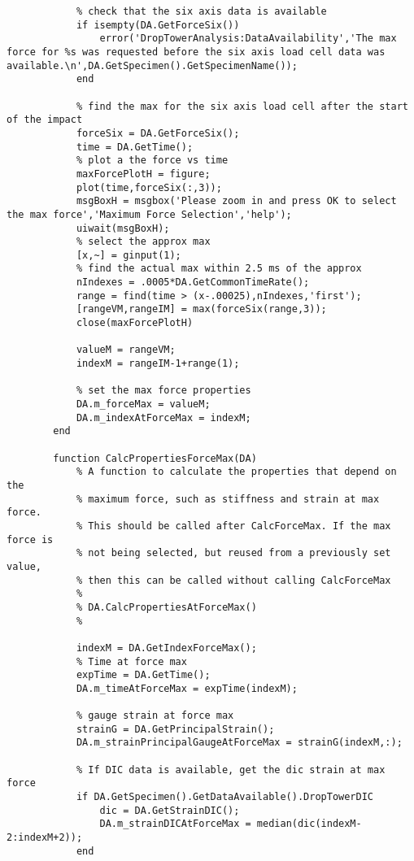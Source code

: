 \begin{lstlisting}
            % check that the six axis data is available
            if isempty(DA.GetForceSix())
                error('DropTowerAnalysis:DataAvailability','The max force for %s was requested before the six axis load cell data was available.\n',DA.GetSpecimen().GetSpecimenName());
            end
            
            % find the max for the six axis load cell after the start of the impact
            forceSix = DA.GetForceSix();
            time = DA.GetTime();
            % plot a the force vs time
            maxForcePlotH = figure;
            plot(time,forceSix(:,3));
            msgBoxH = msgbox('Please zoom in and press OK to select the max force','Maximum Force Selection','help');
            uiwait(msgBoxH);
            % select the approx max
            [x,~] = ginput(1);
            % find the actual max within 2.5 ms of the approx        
            nIndexes = .0005*DA.GetCommonTimeRate();
            range = find(time > (x-.00025),nIndexes,'first');
            [rangeVM,rangeIM] = max(forceSix(range,3));
            close(maxForcePlotH)
            
            valueM = rangeVM;
            indexM = rangeIM-1+range(1);
 
            % set the max force properties
            DA.m_forceMax = valueM;
            DA.m_indexAtForceMax = indexM;
        end
        
        function CalcPropertiesForceMax(DA)
            % A function to calculate the properties that depend on the
            % maximum force, such as stiffness and strain at max force.
            % This should be called after CalcForceMax. If the max force is
            % not being selected, but reused from a previously set value,
            % then this can be called without calling CalcForceMax
            %
            % DA.CalcPropertiesAtForceMax()
            %
            
            indexM = DA.GetIndexForceMax();
            % Time at force max
            expTime = DA.GetTime();
            DA.m_timeAtForceMax = expTime(indexM);
            
            % gauge strain at force max
            strainG = DA.GetPrincipalStrain();
            DA.m_strainPrincipalGaugeAtForceMax = strainG(indexM,:);
            
            % If DIC data is available, get the dic strain at max force
            if DA.GetSpecimen().GetDataAvailable().DropTowerDIC
                dic = DA.GetStrainDIC();
                DA.m_strainDICAtForceMax = median(dic(indexM-2:indexM+2));
            end
            

\end{lstlisting}

